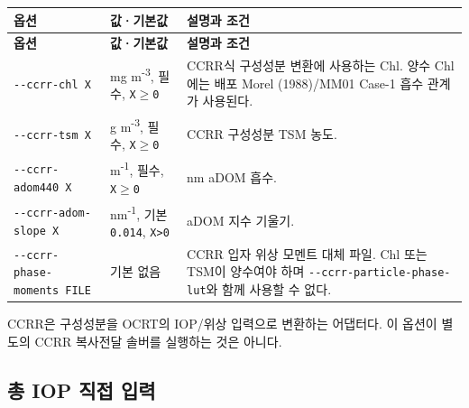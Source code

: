 {\TableFont
\begin{longtable}{@{}>{\raggedright\arraybackslash}p{}>{\raggedright\arraybackslash}p{}>{\raggedright\arraybackslash}p{}@{}}
\toprule
\textbf{옵션} & \textbf{값·기본값} & \textbf{설명과 조건} \\
\midrule
\endfirsthead
\toprule
\textbf{옵션} & \textbf{값·기본값} & \textbf{설명과 조건} \\
\midrule
\endhead
\bottomrule
\endfoot
\texttt{-\allowbreak{}-\allowbreak{}ccrr-\allowbreak{}chl X} & mg m\textsuperscript{-}\textsuperscript{3}, 필수, \texttt{X\ensuremath{\geq}0} & CCRR식 구성성분 변환에 사용하는 Chl. 양수 Chl에는 배포 Morel (1988)/MM01 Case-1 흡수 관계가 사용된다. \\
\texttt{-\allowbreak{}-\allowbreak{}ccrr-\allowbreak{}tsm X} & g m\textsuperscript{-}\textsuperscript{3}, 필수, \texttt{X\ensuremath{\geq}0} & CCRR 구성성분 TSM 농도. \\
\texttt{-\allowbreak{}-\allowbreak{}ccrr-\allowbreak{}adom440 X} & m\textsuperscript{-}\textsuperscript{1}, 필수, \texttt{X\ensuremath{\geq}0} & 440 nm aDOM 흡수. \\
\texttt{-\allowbreak{}-\allowbreak{}ccrr-\allowbreak{}adom-\allowbreak{}slope X} & nm\textsuperscript{-}\textsuperscript{1}, 기본 \texttt{0.\allowbreak{}014}, \texttt{X>0} & aDOM 지수 기울기. \\
\texttt{-\allowbreak{}-\allowbreak{}ccrr-\allowbreak{}phase-\allowbreak{}moments FILE} & 기본 없음 & CCRR 입자 위상 모멘트 대체 파일. Chl 또는 TSM이 양수여야 하며 \texttt{-\allowbreak{}-\allowbreak{}ccrr-\allowbreak{}particle-\allowbreak{}phase-\allowbreak{}lut}와 함께 사용할 수 없다. \\
\end{longtable}
}

CCRR은 구성성분을 OCRT의 IOP/위상 입력으로 변환하는 어댑터다. 이 옵션이 별도의 CCRR 복사전달 솔버를 실행하는 것은 아니다.

\subsection{총 IOP 직접 입력}
\label{sec:auto:03_options:5.3}

